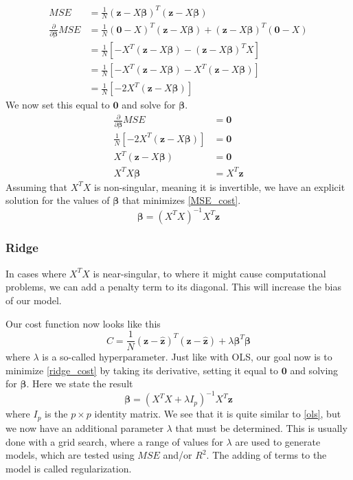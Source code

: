 \documentclass[reprint,english,notitlepage]{revtex4-1}  %
\newcommand{\vect}[1]{\boldsymbol{#1}}
\begin{document}
\begin{align*}
	MSE &= \frac{1}{N}\left(\vect{z} - X\vect{\beta} \right)^T \left(\vect{z} - X\vect{\beta} \right)\\
	\frac{\partial}{\partial \vect{\beta}} MSE 	&= \frac{1}{N}\left(\vect{0} - X \right)^T \left(\vect{z} - X\vect{\beta} \right) + \left(\vect{z} - X\vect{\beta} \right)^T \left(\vect{0} - X \right)\\
	&= \frac{1}{N} \left[-X^T \left(\vect{z} - X\vect{\beta} \right) - \left(\vect{z} - X\vect{\beta} \right)^T X \right]\\
	&= \frac{1}{N} \left[-X^T \left(\vect{z} - X\vect{\beta} \right) - X^T\left(\vect{z} - X\vect{\beta} \right) \right]\\
	&= \frac{1}{N} \left[-2X^T \left(\vect{z} - X\vect{\beta} \right) \right]
\end{align*}
We now set this equal to $\vect{0}$ and solve for $\vect{\beta}$.
\begin{align*}
	\frac{\partial}{\partial \vect{\beta}} MSE 	&= \vect{0}\\
	\frac{1}{N} \left[-2X^T \left(\vect{z} - X\vect{\beta} \right) \right] &= \vect{0}\\
	X^T \left(\vect{z} - X\vect{\beta} \right) &= \vect{0}\\
	X^TX\vect{\beta} &= X^T\vect{z}
\end{align*}
Assuming that $X^TX$ is non-singular, meaning it is invertible, we have an explicit solution for the values of $\vect{\beta}$ that minimizes \ref{MSE_cost}.
\begin{equation} \label{ols}
	\vect{\beta} = \left( X^TX \right)^{-1}X^T\vect{z}
\end{equation}

\subsubsection{Ridge}
In cases where $X^TX$ is near-singular, to where it might cause computational problems, we can add a penalty term to its diagonal. This will increase the bias of our model.

Our cost function now looks like this
\begin{equation} \label{ridge_cost}
	C = \frac{1}{N}\left(\vect{z} - \hat{\vect{z}} \right)^T \left(\vect{z} - \hat{\vect{z}} \right) + \lambda \vect{\beta}^T\vect{\beta}
\end{equation}
where $\lambda$ is a so-called hyperparameter. Just like with OLS, our goal now is to minimize \ref{ridge_cost} by taking its derivative, setting it equal to $\vect{0}$ and solving for $\vect{\beta}$. Here we state the result
\begin{equation} \label{ridge_beta}
	\vect{\beta} = \left( X^TX + \lambda I_p \right)^{-1}X^T\vect{z}
\end{equation}
where $I_p$ is the $p \times p$ identity matrix. We see that it is quite similar to \ref{ols}, but we now have an additional parameter $\lambda$ that must be determined. This is usually done with a grid search, where a range of values for $\lambda$ are used to generate models, which are tested using $MSE$ and/or $R^2$. The adding of terms to the model is called regularization.
\end{document}
